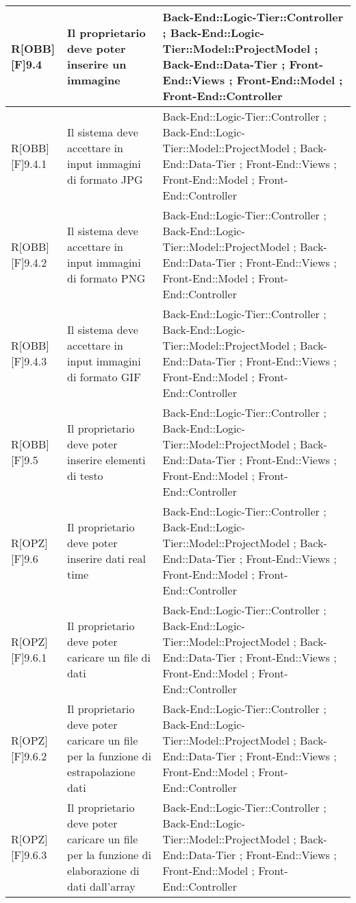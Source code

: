 \begin{table}[h]
\begin{tabular}{|p{}|p{}|p{}|}
			R[OBB][F]9.4 & Il proprietario deve poter inserire un immagine & Back-End::Logic-Tier::Controller ; Back-End::Logic-Tier::Model::ProjectModel ; Back-End::Data-Tier ; Front-End::Views ; Front-End::Model ; Front-End::Controller \\ \midrule
			R[OBB][F]9.4.1 & Il sistema deve accettare in input immagini di formato JPG & Back-End::Logic-Tier::Controller ; Back-End::Logic-Tier::Model::ProjectModel ; Back-End::Data-Tier ; Front-End::Views ; Front-End::Model ; Front-End::Controller \\ \midrule
			R[OBB][F]9.4.2 & Il sistema deve accettare in input immagini di formato PNG & Back-End::Logic-Tier::Controller ; Back-End::Logic-Tier::Model::ProjectModel ; Back-End::Data-Tier ; Front-End::Views ; Front-End::Model ; Front-End::Controller \\ \midrule
			R[OBB][F]9.4.3 & Il sistema deve accettare in input immagini di formato GIF & Back-End::Logic-Tier::Controller ; Back-End::Logic-Tier::Model::ProjectModel ; Back-End::Data-Tier ; Front-End::Views ; Front-End::Model ; Front-End::Controller \\ \midrule
			R[OBB][F]9.5 & Il proprietario deve poter inserire elementi di testo & Back-End::Logic-Tier::Controller ; Back-End::Logic-Tier::Model::ProjectModel ; Back-End::Data-Tier ; Front-End::Views ; Front-End::Model ; Front-End::Controller \\ \midrule
			R[OPZ][F]9.6 & Il proprietario deve poter inserire dati real time & Back-End::Logic-Tier::Controller ; Back-End::Logic-Tier::Model::ProjectModel ; Back-End::Data-Tier ; Front-End::Views ; Front-End::Model ; Front-End::Controller \\ \midrule
			R[OPZ][F]9.6.1 & Il proprietario deve poter caricare un file di dati & Back-End::Logic-Tier::Controller ; Back-End::Logic-Tier::Model::ProjectModel ; Back-End::Data-Tier ; Front-End::Views ; Front-End::Model ; Front-End::Controller \\ \midrule
			R[OPZ][F]9.6.2 & Il proprietario deve poter caricare un file per la funzione di estrapolazione dati & Back-End::Logic-Tier::Controller ; Back-End::Logic-Tier::Model::ProjectModel ; Back-End::Data-Tier ; Front-End::Views ; Front-End::Model ; Front-End::Controller \\ \midrule
			R[OPZ][F]9.6.3 & Il proprietario deve poter caricare un file per la funzione di elaborazione di dati dall'array & Back-End::Logic-Tier::Controller ; Back-End::Logic-Tier::Model::ProjectModel ; Back-End::Data-Tier ; Front-End::Views ; Front-End::Model ; Front-End::Controller \\ \midrule

\end{tabular}
\end{table}
